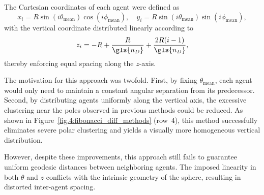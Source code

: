The Cartesian coordinates of each agent were defined as
\begin{equation}
x_i = R \sin(i\theta_{\text{mean}})\cos(i\phi_{\text{mean}}), \quad
y_i = R \sin(i\theta_{\text{mean}})\sin(i\phi_{\text{mean}}),
\end{equation}
with the vertical coordinate distributed linearly according to
\begin{equation}
z_i = -R + \frac{R}{\gls{n_D}} + \frac{2R(i-1)}{\gls{n_D}},
\end{equation}
thereby enforcing equal spacing along the $z$-axis.

The motivation for this approach was twofold. First, by fixing $\theta_{\text{mean}}$, each agent would only need to maintain a constant angular separation from its predecessor. Second, by distributing agents uniformly along the vertical axis, the excessive clustering near the poles observed in previous methods could be reduced. As shown in Figure~\ref{fig.4:fibonacci_diff_methods} (row~4), this method successfully eliminates severe polar clustering and yields a visually more homogeneous vertical distribution.

However, despite these improvements, this approach still fails to guarantee uniform geodesic distances between neighboring agents. The imposed linearity in both $\theta$ and $z$ conflicts with the intrinsic geometry of the sphere, resulting in distorted inter-agent spacing.

